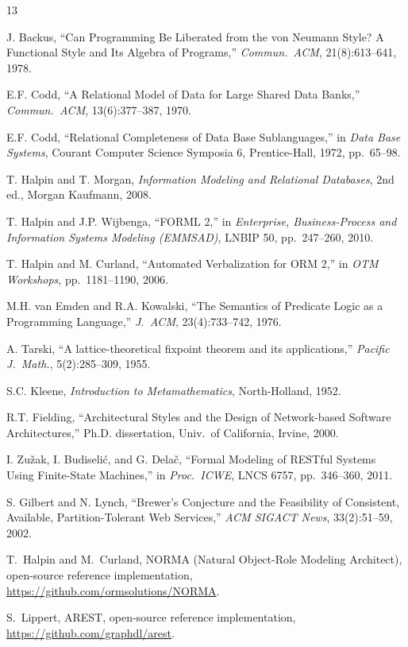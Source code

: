 \documentclass[10pt,twocolumn]{article}
\theoremstyle{plain}
\theoremstyle{definition}
\begin{document}

\begin{thebibliography}{13}

J. Backus, ``Can Programming Be Liberated from the von Neumann Style? A Functional Style and Its Algebra of Programs,'' \emph{Commun.\ ACM}, 21(8):613--641, 1978.

E.F. Codd, ``A Relational Model of Data for Large Shared Data Banks,'' \emph{Commun.\ ACM}, 13(6):377--387, 1970.

E.F. Codd, ``Relational Completeness of Data Base Sublanguages,'' in \emph{Data Base Systems}, Courant Computer Science Symposia 6, Prentice-Hall, 1972, pp.~65--98.

T. Halpin and T. Morgan, \emph{Information Modeling and Relational Databases}, 2nd ed., Morgan Kaufmann, 2008.

T. Halpin and J.P. Wijbenga, ``FORML 2,'' in \emph{Enterprise, Business-Process and Information Systems Modeling (EMMSAD)}, LNBIP 50, pp.~247--260, 2010.

T. Halpin and M. Curland, ``Automated Verbalization for ORM 2,'' in \emph{OTM Workshops}, pp.~1181--1190, 2006.

M.H. van Emden and R.A. Kowalski, ``The Semantics of Predicate Logic as a Programming Language,'' \emph{J.\ ACM}, 23(4):733--742, 1976.

A. Tarski, ``A lattice-theoretical fixpoint theorem and its applications,'' \emph{Pacific J.\ Math.}, 5(2):285--309, 1955.

S.C. Kleene, \emph{Introduction to Metamathematics}, North-Holland, 1952.

R.T. Fielding, ``Architectural Styles and the Design of Network-based Software Architectures,'' Ph.D. dissertation, Univ.\ of California, Irvine, 2000.

I. Zu\v{z}ak, I. Budiseli\'{c}, and G. Dela\v{c}, ``Formal Modeling of RESTful Systems Using Finite-State Machines,'' in \emph{Proc.\ ICWE}, LNCS 6757, pp.~346--360, 2011.

S. Gilbert and N. Lynch, ``Brewer's Conjecture and the Feasibility of Consistent, Available, Partition-Tolerant Web Services,'' \emph{ACM SIGACT News}, 33(2):51--59, 2002.

T.~Halpin and M.~Curland, NORMA (Natural Object-Role Modeling Architect), open-source reference implementation, \url{https://github.com/ormsolutions/NORMA}.

S.~Lippert, AREST, open-source reference implementation, \url{https://github.com/graphdl/arest}.

\end{thebibliography}
\end{document}
